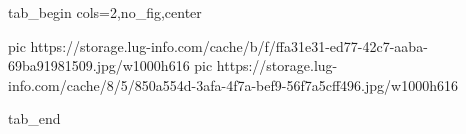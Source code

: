  
 
 
 
 

\ifcmt
  tab_begin cols=2,no_fig,center

     pic https://storage.lug-info.com/cache/b/f/ffa31e31-ed77-42c7-aaba-69ba91981509.jpg/w1000h616%
		 pic https://storage.lug-info.com/cache/8/5/850a554d-3afa-4f7a-bef9-56f7a5cff496.jpg/w1000h616%

  tab_end
\fi
